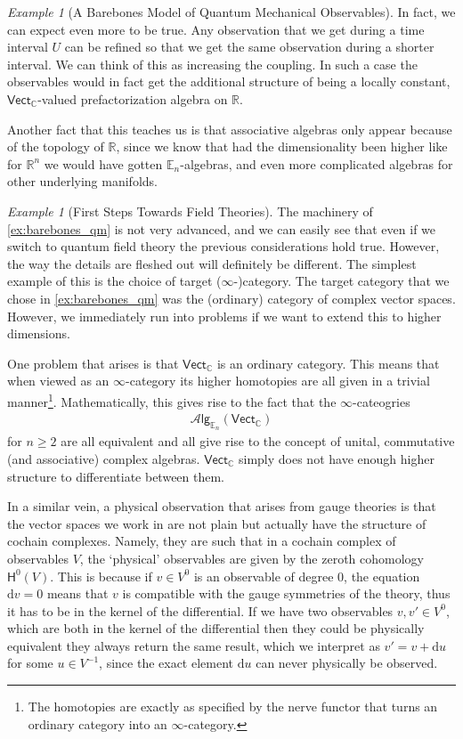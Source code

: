 \documentclass[12pt,a4paper]{article}
\newcounter{counter} \numberwithin{counter}{section}
\theoremstyle{definition}
\theoremstyle{plain}
\theoremstyle{remark}
\newtheorem{example}[counter]{Example}
\newcommand{\alg}[1]{\mathscr{A} \mathsf{lg}_{#1}}
\begin{document}
\begin{example}[A Barebones Model of Quantum Mechanical Observables]
    In fact, we can expect even more to be true. Any observation that we get during a time interval $U$ can be refined so that we get the same observation during a shorter interval. We can think of this as increasing the coupling. In such a case the observables would in fact get the additional structure of being a locally constant, $\mathsf{Vect}_{\mathbb{C}}$-valued prefactorization algebra on $\mathbb{R}$.

    Another fact that this teaches us is that associative algebras only appear because of the topology of $\mathbb{R}$, since we know that had the dimensionality been higher like for $\mathbb{R}^n$ we would have gotten $\mathbb{E}_n$-algebras, and even more complicated algebras for other underlying manifolds.
\end{example}


\begin{example}[First Steps Towards Field Theories]
    The machinery of \cref{ex:barebones_qm} is not very advanced, and we can easily see that even if we switch to quantum field theory the previous considerations hold true. However, the way the details are fleshed out will definitely be different. The simplest example of this is the choice of target ($\infty$-)category. The target category that we chose in \cref{ex:barebones_qm} was the (ordinary) category of complex vector spaces. However, we immediately run into problems if we want to extend this to higher dimensions.

    One problem that arises is that $\mathsf{Vect}_{\mathbb{C}}$ is an ordinary category. This means that when viewed as an $\infty$-category its higher homotopies are all given in a trivial manner\footnote{The homotopies are exactly as specified by the nerve functor that turns an ordinary category into an $\infty$-category.}. Mathematically, this gives rise to the fact that the $\infty$-cateogries
    \begin{align}
        \alg{\mathbb{E}_n} (\mathsf{Vect}_{\mathbb{C}})
    \end{align}
    for $n \geq 2$ are all equivalent and all give rise to the concept of unital, commutative (and associative) complex algebras. $\mathsf{Vect}_{\mathbb{C}}$ simply does not have enough higher structure to differentiate between them. 

    In a similar vein, a physical observation that arises from gauge theories is that the vector spaces we work in are not plain but actually have the structure of cochain complexes. Namely, they are such that in a cochain complex of observables $V$, the `physical' observables are given by the zeroth cohomology $\mathsf{H}^0(V)$. This is because if $v \in V^0$ is an observable of degree 0, the equation $\mathrm{d} v = 0$ means that $v$ is compatible with the gauge symmetries of the theory, thus it has to be in the kernel of the differential. If we have two observables $v, v' \in V^0$, which are both in the kernel of the differential then they could be physically equivalent they always return the same result, which we interpret as $v' = v + \mathrm{d}u$ for some $u \in V^{-1}$, since the exact element $\mathrm{d} u$ can never physically be observed.


\end{example}
\end{document}
